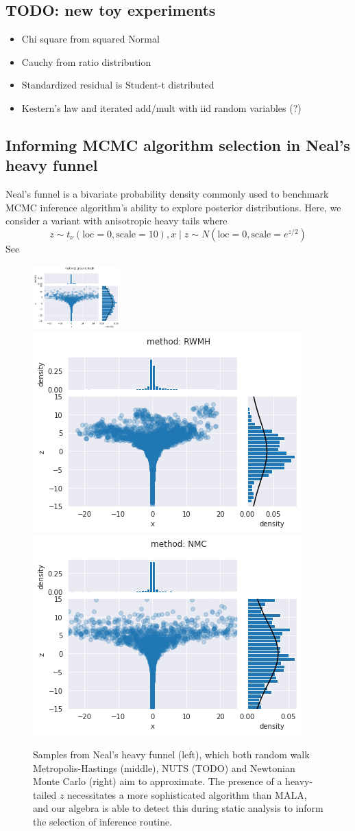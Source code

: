 \documentclass{article}
\theoremstyle{definition}
\begin{document}
{\subsection{TODO: new toy experiments}

\begin{itemize}
    \item Chi square from squared Normal
    \item Cauchy from ratio distribution
    \item Standardized residual is Student-t distributed
    \item Kestern's law and iterated add/mult with iid random variables (?)
\end{itemize}

\subsection{Informing MCMC algorithm selection in Neal's heavy funnel}

Neal's funnel is a bivariate probability density commonly used to benchmark MCMC inference algorithm's ability to explore posterior distributions. Here, we consider a variant with anisotropic heavy tails where
\[
    z \sim t_\nu(\text{loc}=0, \text{scale}=10),
    x \mid z \sim N(\text{loc}=0, \text{scale}=e^{z/2})
\]
See 

\begin{figure}[h]
    \centering
    \includegraphics[width=0.3\textwidth]{figures/nf-1.png}
    \includegraphics[width=0.3\linewidth]{figures/nf-2.png}
    \includegraphics[width=0.3\linewidth]{figures/nf-3.png}
    \caption{Samples from Neal's heavy funnel (left), which both random walk Metropolis-Hastings (middle), NUTS (TODO) and Newtonian Monte Carlo (right) aim to approximate. The presence of a heavy-tailed $z$ necessitates a more sophisticated algorithm than MALA, and our algebra is able to detect this during static analysis to inform the selection of inference routine.}
    \label{fig:neals-funnel}
\end{figure}

}
\end{document}
